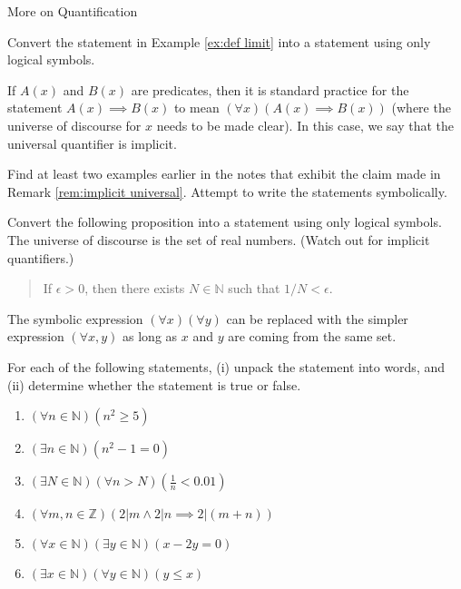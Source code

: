 \begin{section}{More on Quantification}
\begin{exercise}
Convert the statement in Example \ref{ex:def limit} into a statement using only logical symbols.
\end{exercise}

\begin{remark}\label{rem:implicit universal}
If $A(x)$ and $B(x)$ are predicates, then it is standard practice for the statement $A(x)\implies B(x)$ to mean $(\forall x)(A(x)\implies B(x))$ (where the universe of discourse for $x$ needs to be made clear).  In this case, we say that the universal quantifier is implicit.
\end{remark}

\begin{exercise}
Find at least two examples earlier in the notes that exhibit the claim made in Remark \ref{rem:implicit universal}.  Attempt to write the statements symbolically.
\end{exercise}

\begin{exercise}
Convert the following proposition into a statement using only logical symbols.  The universe of discourse is the set of real numbers.  (Watch out for implicit quantifiers.)
\begin{quote}
If $\epsilon >0$, then there exists $N\in\mathbb{N}$ such that $1/N<\epsilon$.
\end{quote}
\end{exercise}

\begin{remark}
The symbolic expression $(\forall x)(\forall y)$ can be replaced with the simpler expression $(\forall x,y)$ as long as $x$ and $y$ are coming from the same set.
\end{remark}

\begin{exercise}
For each of the following statements, (i) unpack the statement into words, and (ii) determine whether the statement is true or false.

\begin{enumerate}
\item $(\forall n \in \mathbb{N})(n^2 \geq 5)$
\item $(\exists n \in \mathbb{N})(n^2-1=0)$
\item $(\exists N \in \mathbb{N})(\forall  n > N)(\frac{1}{n} < 0.01)$
\item $(\forall m, n \in \mathbb{Z})(2|m \wedge 2|n \implies 2|(m+n))$
\item $(\forall x \in \mathbb{N})(\exists y \in \mathbb{N})(x-2y=0)$
\item $(\exists x \in \mathbb{N})(\forall y \in \mathbb{N})(y \leq x)$
\end{enumerate}
\end{exercise}


\end{section}
